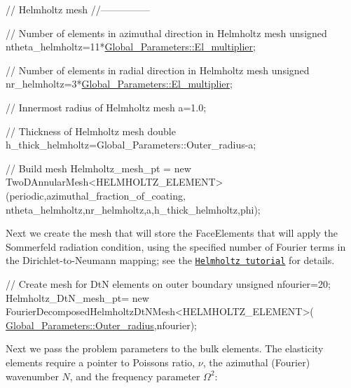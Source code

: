 \begin{DoxyCodeInclude}
 
 
 \textcolor{comment}{// Helmholtz mesh}
 \textcolor{comment}{//---------------}

 \textcolor{comment}{// Number of elements in azimuthal direction in Helmholtz mesh}
 \textcolor{keywordtype}{unsigned} ntheta\_helmholtz=11*\hyperlink{namespaceGlobal__Parameters_a35d5d2ecfff0cec6150a5dc79e5c1ad1}{Global\_Parameters::El\_multiplier};

 \textcolor{comment}{// Number of elements in radial direction in Helmholtz mesh}
 \textcolor{keywordtype}{unsigned} nr\_helmholtz=3*\hyperlink{namespaceGlobal__Parameters_a35d5d2ecfff0cec6150a5dc79e5c1ad1}{Global\_Parameters::El\_multiplier};

 \textcolor{comment}{// Innermost radius of Helmholtz mesh}
 a=1.0;
 
 \textcolor{comment}{// Thickness of Helmholtz mesh}
 \textcolor{keywordtype}{double} h\_thick\_helmholtz=Global\_Parameters::Outer\_radius-a;

 \textcolor{comment}{// Build mesh}
 Helmholtz\_mesh\_pt = \textcolor{keyword}{new} TwoDAnnularMesh<HELMHOLTZ\_ELEMENT>
  (periodic,azimuthal\_fraction\_of\_coating,
   ntheta\_helmholtz,nr\_helmholtz,a,h\_thick\_helmholtz,phi);

\end{DoxyCodeInclude}


Next we create the mesh that will store the {\ttfamily Face\+Elements} that will apply the Sommerfeld radiation condition, using the specified number of Fourier terms in the Dirichlet-\/to-\/\+Neumann mapping; see the \href{../../../fourier_decomposed_helmholtz/sphere_scattering/html/index.html#DtN}{\tt Helmholtz tutorial} for details.


\begin{DoxyCodeInclude}


 \textcolor{comment}{// Create mesh for DtN elements on outer boundary}
 \textcolor{keywordtype}{unsigned} nfourier=20;
 Helmholtz\_DtN\_mesh\_pt=
  \textcolor{keyword}{new} FourierDecomposedHelmholtzDtNMesh<HELMHOLTZ\_ELEMENT>(
   \hyperlink{namespaceGlobal__Parameters_a88ded445ecd7bd89701409e68fd0b900}{Global\_Parameters::Outer\_radius},nfourier);

\end{DoxyCodeInclude}


Next we pass the problem parameters to the bulk elements. The elasticity elements require a pointer to Poisson\textquotesingle{}s ratio, $ \nu $, the azimuthal (Fourier) wavenumber $ N $, and the frequency parameter $ \Omega^2 $\+:



